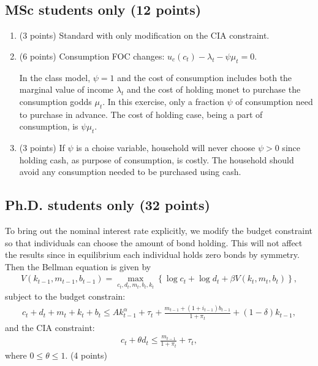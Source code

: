 \documentclass[12pt]{article}
\begin{document}
\subsection*{MSc students only (12 points)}
\begin{enumerate}[label=\arabic*.]
    \item (3 points) Standard with only modification on the CIA constraint.
    \item (6 points) Consumption FOC changes: $u_c(c_t) - \lambda_t - \psi \mu_t = 0$. 
    
    In the class model, $\psi = 1$ and the cost of consumption includes both the marginal value of income $\lambda_t$ and the cost of holding monet to purchase the consumption godds $\mu_t$. In this exercise, only a fraction $\psi$ of consumption need to purchase in advance. The cost of holding case, being a part of consumption, is $\psi \mu_t$.

    \item (3 points) If $\psi$ is a choise variable, household will never choose $\psi > 0$ since holding cash, as purpose of consumption, is costly. The household should avoid any consumption needed to be purchased using cash.
\end{enumerate}

\newpage
\subsection*{Ph.D. students only (32 points)}
To bring out the nominal interest rate explicitly, we modify the budget constraint so that individuals can choose the amount of bond holding. This will not affect the results since in equilibrium each individual holds zero bonds by symmetry. Then the Bellman equation is given by
\begin{align*}
    V(k_{t-1}, m_{t-1}, b_{t-1}) = \max_{c_t, d_t, m_t, b_t, k_t} \left\{\log c_t + \log d_t + \beta V(k_t, m_t, b_t)\right\},
\end{align*}
subject to the budget constrain:
\begin{align*}
    c_t + d_t + m_t + k_t + b_t \leq A k_{t-1}^{\alpha} + \tau_t + \frac{m_{t-1} + (1 + i_{t-1})b_{t-1}}{1+\pi_t} + (1-\delta) k_{t-1},
\end{align*}
and the CIA constraint:
\begin{align*}
    c_t + \theta d_t \leq \frac{m_{t-1}}{1+\pi_t} + \tau_t,
\end{align*}
where $0 \leq \theta \leq 1$. (4 points)
\end{document}
